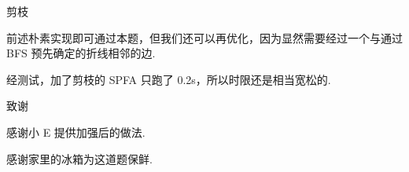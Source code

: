 \begin{frame}{剪枝}

	前述朴素实现即可通过本题，但我们还可以再优化，因为显然需要经过一个与通过 BFS 预先确定的折线相邻的边.

	经测试，加了剪枝的 SPFA 只跑了 0.2s，所以时限还是相当宽松的.

\end{frame}

\begin{frame}{致谢}

	感谢小 E 提供加强后的做法.

	感谢家里的冰箱为这道题保鲜.

\end{frame}

